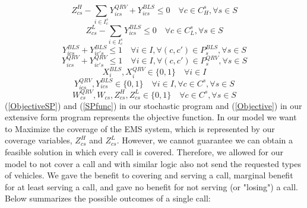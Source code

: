 \documentclass[12pt]{report}
\begin{document}
    \begin{equation}
        \label{EcovHigh}
        Z^H_{cs} - \sum_{i\in I^s_c}Y^{QRV}_{ics} + Y^{BLS}_{ics} \leq 0 \quad  \forall c \in C^s_H, \forall s \in S  
    \end{equation}
    \begin{equation}
        \label{EcovLOW}
        Z^L_{cs} - \sum_{i\in I^s_c} Y^{BLS}_{ics} \leq 0   \quad \forall c \in C^s_L, \forall s \in S 
    \end{equation}
    \begin{equation}
        \label{conflictBLS}
        Y^{BLS}_{ics} + Y^{BLS}_{ic's} \leq 1 \quad  \forall i \in I, \forall (c,c') \in P^{BLS}_{s}, \forall s \in S 
    \end{equation}
    \begin{equation}
        \label{conflictQRV}
        Y^{QRV}_{ics} + Y^{QRV}_{ic's} \leq 1 \quad  \forall i \in I, \forall (c,c') \in P^{QRV}_{s}, \forall s \in S 
    \end{equation}
    \begin{equation}
        \label{Eint0}
        X^{BLS}_{i}, X^{QRV}_i \in \{0,1\} \quad \forall i \in I
    \end{equation}
    \begin{equation}
        \label{Eint1}
        Y^{QRV}_{ics}, Y^{BLS}_{ics} \in \{0,1\} \quad \forall i \in I, \forall c \in C^s, \forall s \in S
    \end{equation}
    \begin{equation}
        \label{Eint2}
        W^{QRV}_{cs}, W_{cs}, Z^H_{cs} , Z^L_{cs} \in \{0,1\} \quad \forall c \in C^s, \forall s \in S
    \end{equation}
(\ref{ObjectiveSP}) and (\ref{SPfunc})  in our stochastic program and (\ref{Objective})  in our extensive form program represents the objective function. In our model we want to Maximize the coverage of the EMS system, which is represented by our coverage variables, $Z^H_{cs}$ and $Z^L_{cs}$. However, we cannot guarantee we can obtain a feasible solution in which every call is covered. Therefore, we allowed for our model to not cover a call and with similar logic also not send the requested types of vehicles. We gave the benefit to covering and serving a call, marginal benefit for at least serving a call, and gave no benefit for not serving (or "losing") a call. Below summarizes the possible outcomes of a single call:
\end{document}
